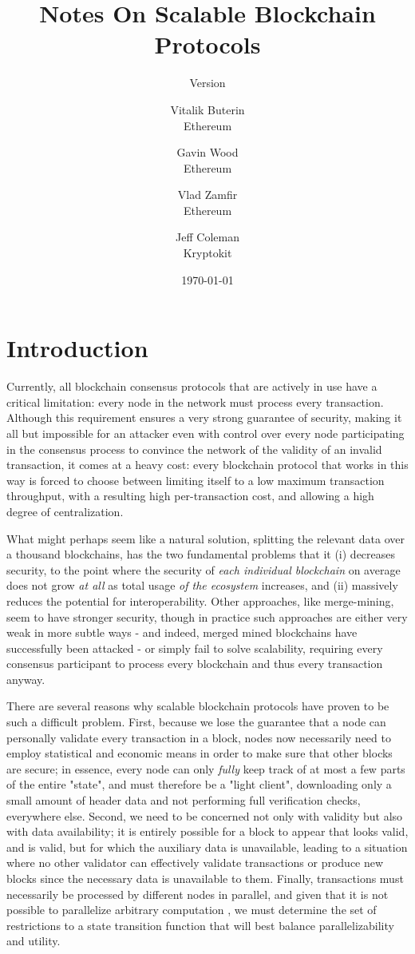 \documentclass[11pt,a4paper]{report}
\title{Notes On Scalable Blockchain Protocols}
\subtitle{Version }
\author{Vitalik Buterin \\ Ethereum \and Gavin Wood \\ Ethereum \and Vlad Zamfir  \\ Ethereum \and Jeff Coleman \\ Kryptokit}
\date{\today}
\theoremstyle{plain}
\theoremstyle{definition}
\theoremstyle{remark}
\begin{document}
\maketitle

\pagebreak
\tableofcontents
\pagebreak

\chapter{Introduction}

Currently, all blockchain consensus protocols that are actively in use have a critical limitation: every node in the network must process every transaction. Although this requirement ensures a very strong guarantee of security, making it all but impossible for an attacker even with control over every node participating in the consensus process to convince the network of the validity of an invalid transaction, it comes at a heavy cost: every blockchain protocol that works in this way is forced to choose between limiting itself to a low maximum transaction throughput, with a resulting high per-transaction cost, and allowing a high degree of centralization.

What might perhaps seem like a natural solution, splitting the relevant data over a thousand blockchains, has the two fundamental problems that it (i) decreases security, to the point where the security of \emph{each individual blockchain} on average does not grow \emph{at all} as total usage \emph{of the ecosystem} increases, and (ii) massively reduces the potential for interoperability. Other approaches, like merge-mining, seem to have stronger security, though in practice such approaches are either very weak in more subtle ways \cite{mmpetertodd} - and indeed, merged mined blockchains have successfully been attacked\cite{coiledcoin} - or simply fail to solve scalability, requiring every consensus participant to process every blockchain and thus every transaction anyway.

There are several reasons why scalable blockchain protocols have proven to be such a difficult problem. First, because we lose the guarantee that a node can personally validate every transaction in a block, nodes now necessarily need to employ statistical and economic means in order to make sure that other blocks are secure; in essence, every node can only \emph{fully} keep track of at most a few parts of the entire "state", and must therefore be a "light client", downloading only a small amount of header data and not performing full verification checks, everywhere else. Second, we need to be concerned not only with validity but also with data availability; it is entirely possible for a block to appear that looks valid, and is valid, but for which the auxiliary data is unavailable, leading to a situation where no other validator can effectively validate transactions or produce new blocks since the necessary data is unavailable to them. Finally, transactions must necessarily be processed by different nodes in parallel, and given that it is not possible to parallelize arbitrary computation \cite{parallelcomputing}, we must determine the set of restrictions to a state transition function that will best balance parallelizability and utility.
\end{document}
